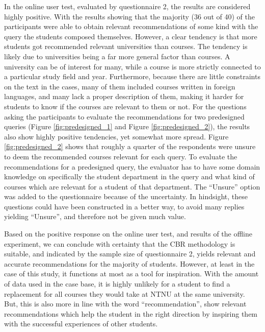 In the online user test, evaluated by questionnaire 2, the results are considered highly positive. With the results showing that the majority (36 out of 40) of the participants were able to obtain relevant recommendations of some kind with the query the students composed themselves. However, a clear tendency is that more students got recommended relevant universities than courses. The tendency is likely due to universities being a far more general factor than courses. A university can be of interest for many, while a course is more strictly connected to a particular study field and year. Furthermore, because there are little constraints on the text in the cases, many of them included courses written in foreign languages, and many lack a proper description of them, making it harder for students to know if the courses are relevant to them or not. For the questions asking the participants to evaluate the recommendations for two predesigned queries (Figure \ref{fig:predesigned_1} and Figure \ref{fig:predesigned_2}), the results also show highly positive tendencies, yet somewhat more spread. Figure \ref{fig:predesigned_2} shows that roughly a quarter of the respondents were unsure to deem the recommended courses relevant for each query. To evaluate the recommendations for a predesigned query, the evaluator has to have some domain knowledge on specifically the student department in the query and what kind of courses which are relevant for a student of that department. The \enquote{Unsure} option was added to the questionnaire because of the uncertainty. In hindsight, these questions could have been constructed in a better way, to avoid many replies yielding \enquote{Unsure}, and therefore not be given much value. 

Based on the positive response on the online user test, and results of the offline experiment, we can conclude with certainty that the CBR methodology is suitable, and indicated by the sample size of questionnaire 2, yields relevant and accurate recommendations for the majority of students. However, at least in the case of this study, it functions at most as a tool for inspiration. With the amount of data used in the case base, it is highly unlikely for a student to find a replacement for all courses they would take at NTNU at the same university. But, this is also more in line with the word \enquote{recommendation}, show relevant recommendations which help the student in the right direction by inspiring them with the successful experiences of other students. 


